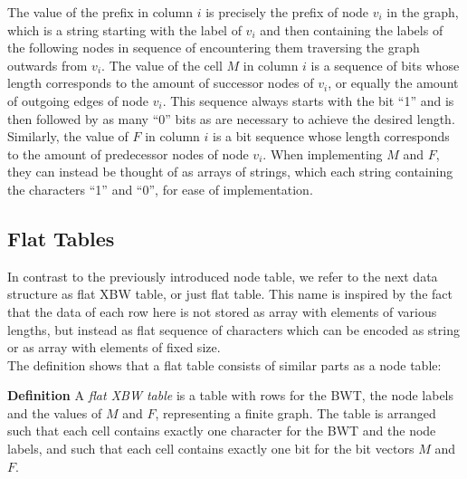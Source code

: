 \documentclass[a4paper,12pt,twoside,BCOR=10mm]{scrbook}
\begin{document}
The value of the prefix in column $ i $ is precisely the prefix of node $ v_i $ in the graph, 
which is a string starting with the label of $ v_i $ and then containing 
the labels of the following nodes in sequence of encountering them traversing 
the graph outwards from $ v_i $.
The value of the cell $ M $ in column $ i $ is a sequence of bits whose length corresponds to 
the amount of successor nodes of $ v_i $, or equally the amount of outgoing edges of node $ v_i $. 
This sequence always starts with the bit “1” and is then followed 
by as many “0” bits as are necessary to achieve the desired length. 
Similarly, the value of $ F $ in column $ i $ is a bit sequence whose length corresponds to 
the amount of predecessor nodes of node $ v_i $. 
When implementing $ M $ and $ F $, they can instead be thought of as arrays of strings, 
which each string containing the characters “1” and “0”, for ease of implementation.

\subsection{Flat Tables}
\label{sec:flat_table_definition}

In contrast to the previously introduced node table, 
we refer to the next data structure as flat XBW table, or just flat table. 
This name is inspired by the fact that the data of each row here is not 
stored as array with elements of various lengths, 
but instead as flat sequence of characters which can be encoded as string 
or as array with elements of fixed size. \\
The definition shows that a flat table consists of similar parts as a node table:

\textbf{Definition} A \textit{flat XBW table} is a table with rows for the BWT, 
the node labels and the values of $ M $ and $ F $, 
representing a finite graph. 
The table is arranged such that each cell contains exactly one character 
for the BWT and the node labels, and such that each cell contains exactly 
one bit for the bit vectors $ M $ and $ F $.
\end{document}
